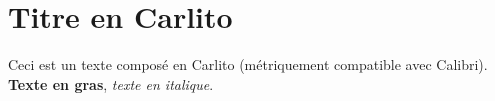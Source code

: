 \documentclass{scrartcl}
\begin{document}
\section{Titre en Carlito}
Ceci est un texte composé en Carlito (métriquement compatible avec Calibri).
\textbf{Texte en gras}, \textit{texte en italique}.
\end{document}
